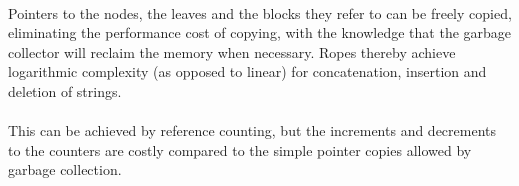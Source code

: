 \documentclass[12pt,twoside,notitlepage]{report}
\begin{document}
\paragraph{}
Pointers to the nodes, the leaves and the blocks they refer to can be freely copied, eliminating the performance cost of copying, with the knowledge that the garbage collector will reclaim the memory when necessary. Ropes thereby achieve logarithmic complexity (as opposed to linear) for concatenation, insertion and deletion of strings.

\paragraph{}
This can be achieved by reference counting, but the increments and decrements to the counters are costly compared to the simple pointer copies allowed by garbage collection.
\end{document}
